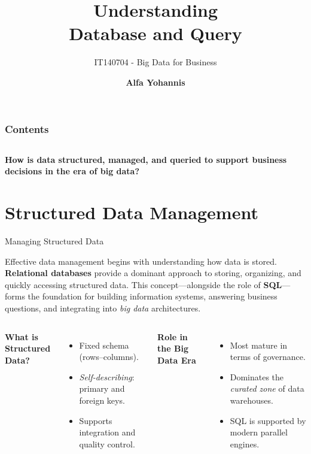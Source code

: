 \documentclass[aspectratio=169, table]{beamer}
\title{\Huge Understanding\\
\vspace{10pt}
Database and Query}
\subtitle{IT140704 - Big Data for Business}
\author{\textbf{Alfa Yohannis}}
\begin{document}
\frame{\titlepage}


\begin{frame}[fragile]
\frametitle{Contents}
\vspace{20pt}
\begin{columns}[t]
	\tableofcontents[sections={1-4}]
	
	\tableofcontents[sections={5-8}]
\end{columns}
\end{frame}


\begin{frame}{\hfill}
\centering
\Huge{\textbf{How is data structured, managed, and queried to support business decisions in the era of big data?}}
\end{frame}


\section{Structured Data Management}

\begin{frame}[fragile]{Managing Structured Data}
\vspace{20pt}

Effective data management begins with understanding how data is stored. \textbf{Relational databases} provide a dominant approach to storing, organizing, and quickly accessing structured data. This concept—alongside the role of \textbf{SQL}—forms the foundation for building information systems, answering business questions, and integrating into \emph{big data} architectures.\\[12pt]

\begin{columns}[T]
\textbf{What is Structured Data?}
\begin{itemize}
	\item Fixed schema (rows–columns).
	\item \emph{Self-describing}: primary and foreign keys.
	\item Supports integration and quality control.
\end{itemize}

\textbf{Role in the Big Data Era}
\begin{itemize}
	\item Most mature in terms of governance.
	\item Dominates the \emph{curated zone} of data warehouses.
	\item SQL is supported by modern parallel engines.
\end{itemize}
\end{columns}

\end{frame}
\end{document}

